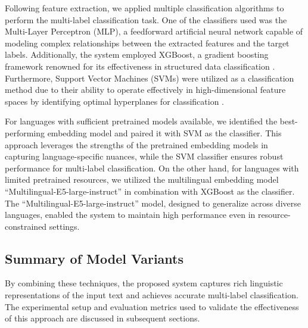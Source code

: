 Following feature extraction, we applied multiple classification algorithms to perform the multi-label classification task. One of the classifiers used was the Multi-Layer Perceptron (MLP), a feedforward artificial neural network capable of modeling complex relationships between the extracted features and the target labels. Additionally, the system employed XGBoost, a gradient boosting framework renowned for its effectiveness in structured data classification \citep{chen2016xgboost}. Furthermore, Support Vector Machines (SVMs) were utilized as a classification method due to their ability to operate effectively in high-dimensional feature spaces by identifying optimal hyperplanes for classification \citep{cortes1995support}.

For languages with sufficient pretrained models available, we identified the best-performing embedding model and paired it with SVM as the classifier. This approach leverages the strengths of the pretrained embedding models in capturing language-specific nuances, while the SVM classifier ensures robust performance for multi-label classification. On the other hand, for languages with limited pretrained resources, we utilized the multilingual embedding model ``Multilingual-E5-large-instruct'' \citep{wang2024multilingual} in combination with XGBoost as the classifier. The ``Multilingual-E5-large-instruct'' model, designed to generalize across diverse languages, enabled the system to maintain high performance even in resource-constrained settings.

\subsection{Summary of Model Variants}

By combining these techniques, the proposed system captures rich linguistic representations of the input text and achieves accurate multi-label classification. The experimental setup and evaluation metrics used to validate the effectiveness of this approach are discussed in subsequent sections.